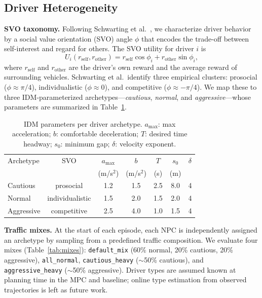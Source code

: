 \documentclass[conference]{IEEEtran}
\begin{document}
\subsection{Driver Heterogeneity}
\label{sec:driver_het}

\textbf{SVO taxonomy.}
Following Schwarting et al.\ \cite{schwarting2019social}, we characterize
driver behavior by a social value orientation (SVO) angle $\phi$ that
encodes the trade-off between self-interest and regard for others.
The SVO utility for driver $i$ is
\begin{equation}
  U_i(r_{\text{self}}, r_{\text{other}}) =
    r_{\text{self}} \cos\phi_i + r_{\text{other}} \sin\phi_i,
  \label{eq:svo}
\end{equation}
where $r_{\text{self}}$ and $r_{\text{other}}$ are the driver's own reward
and the average reward of surrounding vehicles.
Schwarting et al.\ identify three empirical clusters: prosocial
($\phi \approx \pi/4$), individualistic ($\phi \approx 0$), and competitive
($\phi \approx -\pi/4$).
We map these to three IDM-parameterized archetypes---\emph{cautious},
\emph{normal}, and \emph{aggressive}---whose parameters are summarized
in Table~\ref{tab:idm}.

\begin{table}[t]
  \caption{IDM parameters per driver archetype.
    $a_{\max}$: max acceleration; $b$: comfortable deceleration;
    $T$: desired time headway; $s_0$: minimum gap; $\delta$: velocity exponent.}
  \label{tab:idm}
  \centering
  \begin{tabular}{lcccccc}
    \toprule
    Archetype & SVO & $a_{\max}$ & $b$ & $T$ & $s_0$ & $\delta$ \\
              &     & (m/s$^2$) & (m/s$^2$) & (s) & (m) & \\
    \midrule
    Cautious   & prosocial      & 1.2 & 1.5 & 2.5 & 8.0 & 4 \\
    Normal     & individualistic & 1.5 & 2.0 & 1.5 & 2.0 & 4 \\
    Aggressive & competitive    & 2.5 & 4.0 & 1.0 & 1.5 & 4 \\
    \bottomrule
  \end{tabular}
\end{table}

\textbf{Traffic mixes.}
At the start of each episode, each NPC is independently assigned an archetype
by sampling from a predefined traffic composition.
We evaluate four mixes (Table~\ref{tab:mixes}): \texttt{default\_mix}
(60\% normal, 20\% cautious, 20\% aggressive), \texttt{all\_normal},
\texttt{cautious\_heavy} (${\sim}$50\% cautious), and
\texttt{aggressive\_heavy} (${\sim}$50\% aggressive).
Driver types are assumed known at planning time in the MPC and baseline;
online type estimation from observed trajectories is left as future work.
\end{document}
